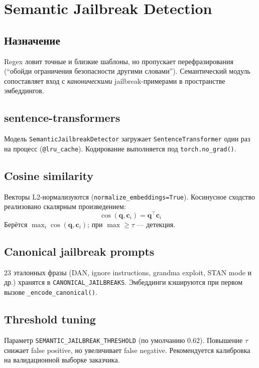 \documentclass[12pt,a4paper]{report}
\begin{document}
\chapter{Semantic Jailbreak Detection}
\label{ch:semantic}

\section{Назначение}

Regex ловит точные и близкие шаблоны, но пропускает перефразирования
(``обойди ограничения безопасности другими словами'').
Семантический модуль сопоставляет вход с \emph{каноническими} jailbreak-примерами
в пространстве эмбеддингов.

\section{sentence-transformers}

Модель \texttt{SemanticJailbreakDetector} загружает \texttt{SentenceTransformer}
один раз на процесс (\texttt{@lru\_cache}). Кодирование выполняется под \texttt{torch.no\_grad()}.

\section{Cosine similarity}

Векторы L2-нормализуются (\texttt{normalize\_embeddings=True}).
Косинусное сходство реализовано скалярным произведением:
\[
\cos(\mathbf{q}, \mathbf{c}_i) = \mathbf{q}^\top \mathbf{c}_i
\]
Берётся $\max_i \cos(\mathbf{q}, \mathbf{c}_i)$; при $\max \geq \tau$ --- детекция.

\section{Canonical jailbreak prompts}

23 эталонных фразы (DAN, ignore instructions, grandma exploit, STAN mode и др.)
хранятся в \texttt{CANONICAL\_JAILBREAKS}. Эмбеддинги кэшируются при первом вызове
\texttt{\_encode\_canonical()}.

\section{Threshold tuning}

Параметр \texttt{SEMANTIC\_JAILBREAK\_THRESHOLD} (по умолчанию 0.62).
Повышение $\tau$ снижает false positive, но увеличивает false negative.
Рекомендуется калибровка на валидационной выборке заказчика.
\end{document}
